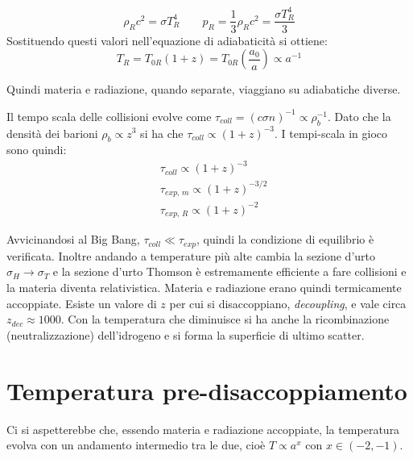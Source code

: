 $$
 \rho_R c^2 = \sigma T_R^4 \qquad p_R = \frac{1}{3}\rho_R c^2 = \frac{\sigma T_R^4}{3}
$$
Sostituendo questi valori nell'equazione di adiabaticità si ottiene:
\begin{equation}
    T_R = T_{0R} (1+z) = T_{0R}\left ( \frac{a_0}{a}\right )  \propto a^{-1}
\end{equation}

Quindi materia e radiazione, quando separate, viaggiano su adiabatiche diverse.




Il tempo scala delle collisioni evolve come $\tau_{coll}=(c\sigma n)^{-1} \propto \rho_b^{-1}$. Dato che la densità dei barioni $\rho_b \propto z^3$ si ha che $\tau_{coll}\propto (1+z)^{-3}$. I tempi-scala in gioco sono quindi:
\begin{align*}
    & \tau_{coll} \propto (1+z)^{-3} \\
    & \tau_{exp, \, m} \propto (1+z)^{-3/2} \\
    & \tau_{exp, \, R} \propto (1+z)^{-2}
\end{align*}

Avvicinandosi al Big Bang, $\tau_{coll}\ll \tau_{exp}$, quindi la condizione di equilibrio è verificata. Inoltre andando a temperature più alte cambia la sezione d'urto $\sigma_H \rightarrow \sigma_T$ e la sezione d'urto Thomson è estremamente efficiente a fare collisioni e la materia diventa relativistica. Materia e radiazione erano quindi termicamente accoppiate. Esiste un valore di $z$ per cui si disaccoppiano, \textit{decoupling}, e vale circa $z_{dec}\approx 1000$. Con la temperatura che diminuisce si ha anche la ricombinazione (neutralizzazione) dell'idrogeno e si forma la superficie di ultimo scatter.

\section{Temperatura pre-disaccoppiamento}
Ci si aspetterebbe che, essendo materia e radiazione accoppiate, la temperatura evolva con un andamento intermedio tra le due, cioè $T\propto a^x$ con $x\in (-2, -1)$.
